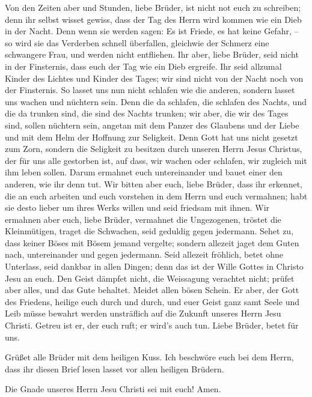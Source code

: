  Von den Zeiten aber und Stunden, liebe Brüder, ist nicht
not euch zu schreiben;  denn ihr selbst wisset gewiss,
dass der Tag des Herrn wird kommen wie ein Dieb in der Nacht.
 Denn wenn sie werden sagen: Es ist Friede, es hat keine
Gefahr, -- so wird sie das Verderben schnell überfallen, gleichwie der
Schmerz eine schwangere Frau, und werden nicht entfliehen.
 Ihr aber, liebe Brüder, seid nicht in der Finsternis,
dass euch der Tag wie ein Dieb ergreife.  Ihr seid
allzumal Kinder des Lichtes und Kinder des Tages; wir sind nicht von der
Nacht noch von der Finsternis.  So lasset uns nun nicht
schlafen wie die anderen, sondern lasset uns wachen und nüchtern sein.
 Denn die da schlafen, die schlafen des Nachts, und die da
trunken sind, die sind des Nachts trunken;  wir aber, die
wir des Tages sind, sollen nüchtern sein, angetan mit dem Panzer des
Glaubens und der Liebe und mit dem Helm der Hoffnung zur Seligkeit.
 Denn Gott hat uns nicht gesetzt zum Zorn, sondern die
Seligkeit zu besitzen durch unseren Herrn Jesus Christus,
 der für uns alle gestorben ist, auf dass, wir wachen
oder schlafen, wir zugleich mit ihm leben sollen.  Darum
ermahnet euch untereinander und bauet einer den anderen, wie ihr denn
tut.  Wir bitten aber euch, liebe Brüder, dass ihr
erkennet, die an euch arbeiten und euch vorstehen in dem Herrn und euch
vermahnen;  habt sie desto lieber um ihres Werks willen
und seid friedsam mit ihnen.  Wir ermahnen aber euch,
liebe Brüder, vermahnet die Ungezogenen, tröstet die Kleinmütigen,
traget die Schwachen, seid geduldig gegen jedermann. 
Sehet zu, dass keiner Böses mit Bösem jemand vergelte; sondern allezeit
jaget dem Guten nach, untereinander und gegen jedermann. 
Seid allezeit fröhlich,  betet ohne Unterlass,
 seid dankbar in allen Dingen; denn das ist der Wille
Gottes in Christo Jesu an euch.  Den Geist dämpfet nicht,
 die Weissagung verachtet nicht;  prüfet
aber alles, und das Gute behaltet.  Meidet allen bösen
Schein.  Er aber, der Gott des Friedens, heilige euch
durch und durch, und euer Geist ganz samt Seele und Leib müsse bewahrt
werden unsträflich auf die Zukunft unseres Herrn Jesu Christi.
 Getreu ist er, der euch ruft; er wird's auch tun.
 Liebe Brüder, betet für uns.

 Grüßet alle Brüder mit dem heiligen Kuss.
 Ich beschwöre euch bei dem Herrn, dass ihr diesen Brief
lesen lasset vor allen heiligen Brüdern.

 Die Gnade unseres Herrn Jesu Christi sei mit euch! Amen.
